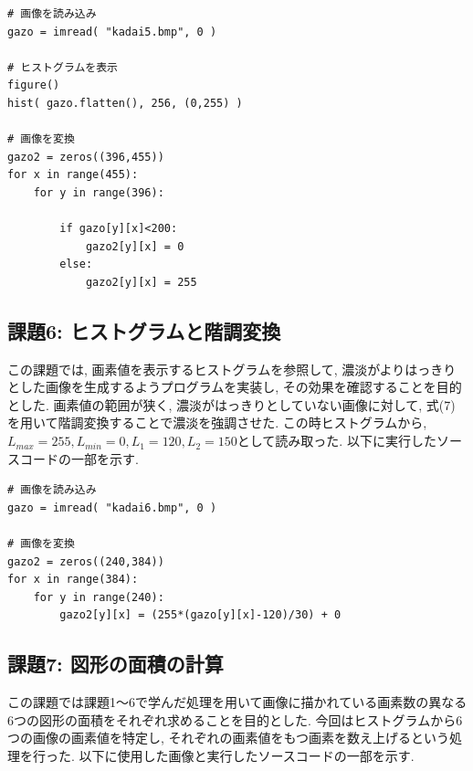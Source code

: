 \documentclass[a4paper,11pt,uplatex, titlepage]{jsarticle}
\begin{document}
\begin{lstlisting}[basicstyle=\ttfamily\footnotesize]
# 画像を読み込み
gazo = imread( "kadai5.bmp", 0 )

# ヒストグラムを表示
figure()
hist( gazo.flatten(), 256, (0,255) )

# 画像を変換
gazo2 = zeros((396,455))
for x in range(455):
    for y in range(396):

        if gazo[y][x]<200:
            gazo2[y][x] = 0
        else:
            gazo2[y][x] = 255
\end{lstlisting}

\subsection{課題6: ヒストグラムと階調変換}
この課題では, 画素値を表示するヒストグラムを参照して, 濃淡がよりはっきりとした画像を生成するようプログラムを実装し,
その効果を確認することを目的とした.
画素値の範囲が狭く, 濃淡がはっきりとしていない画像に対して, 式(7)を用いて階調変換することで濃淡を強調させた.
この時ヒストグラムから, $L_{max} = 255, L_{min} = 0, L_1 = 120, L_2 = 150$として読み取った.
以下に実行したソースコードの一部を示す.
\begin{lstlisting}[basicstyle=\ttfamily\footnotesize]
# 画像を読み込み
gazo = imread( "kadai6.bmp", 0 )

# 画像を変換
gazo2 = zeros((240,384))
for x in range(384):
    for y in range(240):
        gazo2[y][x] = (255*(gazo[y][x]-120)/30) + 0
\end{lstlisting}

\subsection{課題7: 図形の面積の計算}
この課題では課題1〜6で学んだ処理を用いて画像に描かれている画素数の異なる6つの図形の面積をそれぞれ求めることを目的とした.
今回はヒストグラムから6つの画像の画素値を特定し, それぞれの画素値をもつ画素を数え上げるという処理を行った.
以下に使用した画像と実行したソースコードの一部を示す.
\end{document}
